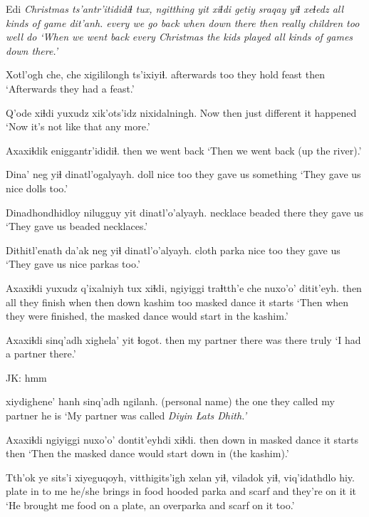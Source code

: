 \documentclass[12pt]{article}
\begin{document}
\gll Edi \em{Christmas} ts'antr'itididiɬ tux, ngitthing yit xiɬdi getiy sraqay yiɬ xeɬedz {all kinds of game} dit'anh.
every {} {we go back} when down      there then really children too well {} do
\glt `When we went back every Christmas the kids played all kinds of games down there.'
\glend

\gll Xotl'ogh che, che xigililongh   ts'ixiyiɬ.
afterwards too {} {they hold feast} {then}
\glt `Afterwards they had a feast.'
\glend

\gll Q'ode xiɬdi yuxudz xik'ots'idz nixidalningh.
Now   then   just   {different} {it happened}
\glt `Now it's not like that any more.'
\glend

\gll Axaxiɬdik eniggantr'ididiɬ.
then      {we went back}
\glt `Then we went back (up the river).'
\glend

\gll Dina' neg  yiɬ dinatl'ogalyayh.
doll  nice too {they gave us something}
\glt `They gave us nice dolls too.'
\glend

\gll Dinadhondhidloy nilugguy yit dinatl'o'alyayh.
necklace        beaded   there  {they gave us}
\glt `They gave us beaded necklaces.'
\glend

\gll Dithitl'enath da'ak neg yiɬ dinatl'o'alyayh.
cloth         parka nice too {they gave us}
\glt `They gave us nice parkas too.'
\glend

\gll Axaxiɬdi yuxudz q'ixalniyh tux xiɬdi, ngiyiggi traɬtth'e che nuxo'o' ditit'eyh.
then     all    {they finish} when then down kashim too     {masked dance} {it starts}
\glt `Then when they were finished, the masked dance would start in the kashim.'
\glend

\gll Axaxiɬdi sinq'adh xighela' yit ɬogot.
then     {my partner} {there was} there truly
\glt `I had a partner there.'
\glend

JK:  hmm

 {xiydighene' hanh} sinq'adh ngilanh.
{(personal name)} {the one they called} {my partner} {he is}
\glt `My partner was called \em Diyin Łats Dhith.'
\glend

\gll Axaxiɬdi ngiyiggi   nuxo'o' dontit'eyhdi xiɬdi.
then     {down in} {masked dance} {it starts} then
\glt `Then the masked dance would start down in (the kashim).'
\glend

\gll Tth'ok ye sits'i xiyeguqoyh, {vitthigits'igh xelan} yiɬ, viladok yiɬ, viq'idathdlo hiy.
plate in {to me} {he/she brings in food} {hooded parka} and scarf and {they're on it} it
\glt `He brought me food on a plate, an overparka and scarf on it too.' 
\glend
\end{document}
